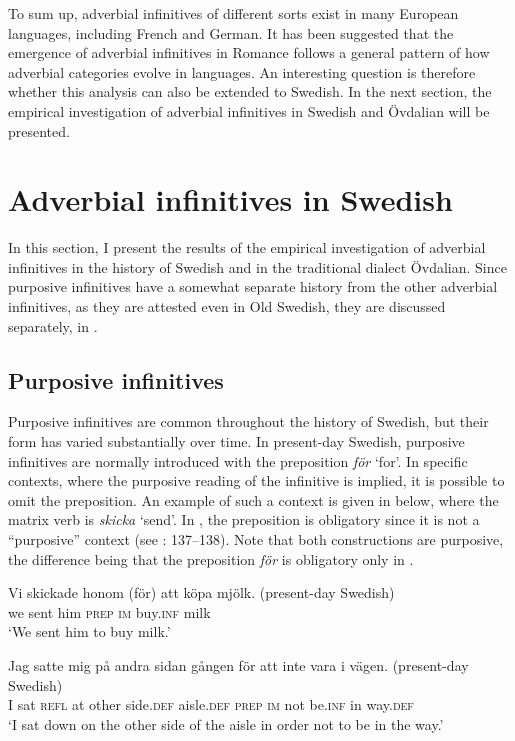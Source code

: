 \documentclass[output=paper]{langscibook}
\begin{document}
To sum up, adverbial infinitives of different sorts exist in many European languages, including French and German. It has been suggested that the emergence of adverbial infinitives in Romance follows a general pattern of how adverbial categories evolve in languages. An interesting question is therefore whether this analysis can also be extended to Swedish. In the next section, the empirical investigation of adverbial infinitives in Swedish and Övdalian will be presented. 


\section{Adverbial infinitives in Swedish}\label{sec:kalm:4}
In this section, I present the results of the empirical investigation of adverbial infinitives in the history of Swedish and in the traditional dialect Övdalian. Since purposive infinitives have a somewhat separate history from the other adverbial infinitives, as they are attested even in Old Swedish, they are discussed separately, in .


\subsection{Purposive infinitives}\label{sec:kalm:4.1}
Purposive infinitives are common throughout the history of Swedish, but their form has varied substantially over time. In present-day Swedish, purposive infinitives are normally introduced with the preposition \textit{för} ‘for’. In specific contexts, where the purposive reading of the infinitive is implied, it is possible to omit the preposition. An example of such a context is given in  below, where the matrix verb is \textit{skicka} ‘send’. In , the preposition is obligatory since it is not a “purposive” context (see \citealt{Kalm2016Satsekvivalenta}: 137–138). Note that both constructions are purposive, the difference being that the preposition \textit{för} is obligatory only in . 


\ea
\label{ex:kalm:8}
\ea \label{ex:kalm:8a}
\gll Vi skickade honom (för) att köpa mjölk. (present-day Swedish)\\
we sent him \textsc{prep} \textsc{im} buy.\textsc{inf} milk\\
\glt ‘We sent him to buy milk.’

\ex  \label{ex:kalm:8b}
\gll Jag satte mig på andra sidan gången för att inte vara i vägen. (present-day Swedish)\\
 I sat \textsc{refl} at other side.\textsc{def} aisle.\textsc{def} \textsc{prep} \textsc{im} not be.\textsc{inf} in way.\textsc{def}\\
\glt ‘I sat down on the other side of the aisle in order not to be in the way.’
\z 
\z 
\end{document}
